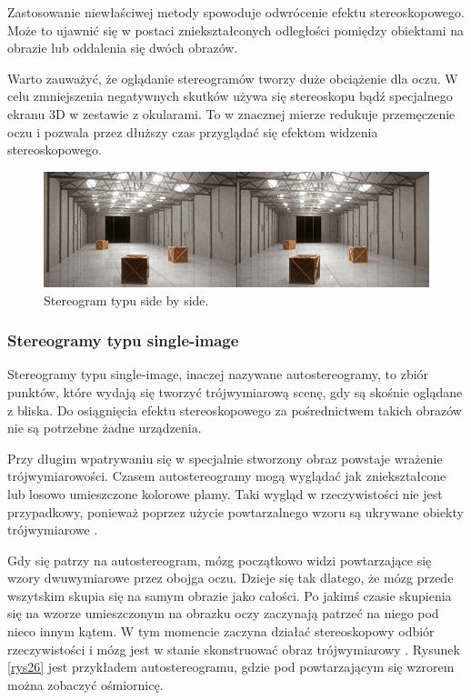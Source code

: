 Zastosowanie niewłaściwej metody spowoduje odwrócenie efektu stereoskopowego. Może to ujawnić się w postaci zniekształconych odległości pomiędzy obiektami na obrazie lub oddalenia się dwóch obrazów.

Warto zauważyć, że oglądanie stereogramów tworzy duże obciążenie dla oczu. W celu zmniejszenia negatywnych skutków używa się stereoskopu bądź specjalnego ekranu 3D w zestawie z okularami. To w znacznej mierze redukuje przemęczenie oczu i pozwala przez dłuższy czas przyglądać się efektom widzenia stereoskopowego.
\begin{figure}[H]
		\centering
 		\includegraphics[width=13cm]{sbs.jpg}
    	\caption{Stereogram typu side by side\cite{sidebyside}.}
 		\label{rys1}
\end{figure}

\subsubsection{Stereogramy typu single-image} 
Stereogramy typu single-image, inaczej nazywane autostereogramy, to zbiór punktów, które wydają się tworzyć trójwymiarową scenę, gdy są skośnie oglądane z bliska. Do osiągnięcia efektu stereoskopowego za pośrednictwem takich obrazów nie są potrzebne żadne urządzenia.

Przy długim wpatrywaniu się w specjalnie stworzony obraz powstaje wrażenie trójwymiarowości. Czasem autostereogramy mogą wyglądać jak zniekształcone lub losowo umieszczone kolorowe plamy. Taki wygląd w rzeczywistości nie jest przypadkowy, ponieważ poprzez użycie powtarzalnego wzoru są ukrywane obiekty trójwymiarowe \cite{stereoscopythesis}.

Gdy się patrzy na autostereogram, mózg początkowo widzi powtarzające się wzory dwuwymiarowe przez obojga oczu. Dzieje się tak dlatego, że mózg przede wszytskim skupia się na samym obrazie jako całości. Po jakimś czasie skupienia się na wzorze umieszczonym na obrazku oczy zaczynają patrzeć na niego pod nieco innym kątem. W tym momencie zaczyna działać stereoskopowy odbiór rzeczywistości i mózg jest w stanie skonstruować obraz trójwymiarowy \cite{autostereogramInfo}. Rysunek \ref{rys26} jest przykładem autostereogramu, gdzie pod powtarzającym się wzrorem można zobaczyć ośmiornicę.

